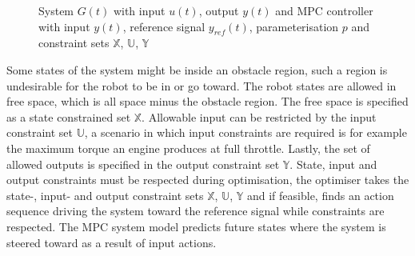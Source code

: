 \begin{figure}[H]
\centering
{}
\caption{System $G(t)$ with input ${u}(t)$, output $y(t)$ and \acs{MPC} controller with input $y(t)$, reference signal $y_{ref}(t)$, parameterisation $p$ and constraint sets $\mathbb{X}$, $\mathbb{U}$, $\mathbb{Y}$} \label{figure: mpc_block_diagam} \end{figure}  

Some states of the system might be inside an obstacle region, such a region is undesirable for the robot to be in or go toward. The robot states are allowed in free space, which is all space minus the obstacle region. The free space is specified as a state constrained set $\mathbb{X}$. Allowable input can be restricted by the input constraint set $\mathbb{U}$, a scenario in which input constraints are required is for example the maximum torque an engine produces at full throttle. Lastly, the set of allowed outputs is specified in the output constraint set $\mathbb{Y}$. State, input and output constraints must be respected during optimisation, the optimiser takes the state-, input- and output constraint sets $\mathbb{X}$, $\mathbb{U}$, $\mathbb{Y}$ and if feasible, finds an action sequence driving the system toward the reference signal while constraints are respected. The \ac{MPC} system model predicts future states where the system is steered toward as a result of input actions.\\

